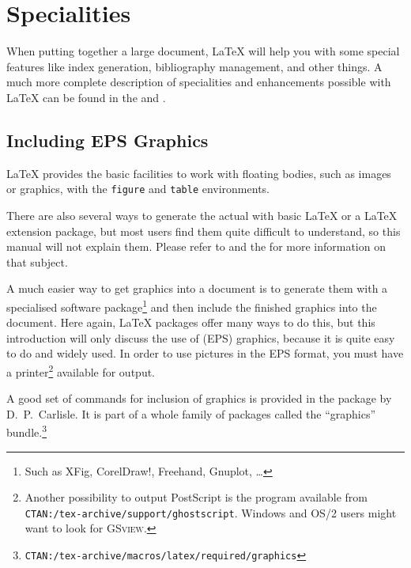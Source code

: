  
\chapter{Specialities}
\begin{intro}
  When putting together a large document, \LaTeX{} will help you
  with some special features like index generation,
  bibliography management, and other things.
  A much more complete description of specialities and
  enhancements possible with \LaTeX{} can be found in the
  {\normalfont\manual{}} and {\normalfont \companion}.
\end{intro}

\section{Including EPS Graphics}\label{eps}
\LaTeX{} provides the basic facilities to work with floating bodies,
such as images or graphics, with the \texttt{figure} and
\texttt{table} environments.

There are also several ways to generate the actual
 with basic \LaTeX{} or a \LaTeX{} extension package,
but most users find them quite difficult to understand, so
this manual will not explain them.
Please refer to \companion{} and the \manual{} for more information on
that subject.

A much easier way to get graphics into a document is to generate them
with a specialised software package\footnote{Such as XFig, CorelDraw!,
  Freehand, Gnuplot, \ldots} and then include the finished graphics
into the document. Here again, \LaTeX{} packages offer many ways to do
this, but this introduction will only discuss the use of  (EPS) graphics, because it is quite
easy to do and widely used.  In order to use pictures in the EPS
format, you must have a  printer\footnote{Another
  possibility to output PostScript is the \textsc{}
  program available from
  \texttt{CTAN:/tex-archive/support/ghostscript}. Windows and OS/2 users might
  want to look for \textsc{GSview}.} available for output.

A good set of commands for inclusion of graphics is provided in the
 package by D.~P.~Carlisle. It is part of a whole family
of packages called the ``graphics''
bundle.\footnote{\texttt{CTAN:/tex-archive/macros/latex/required/graphics}}

